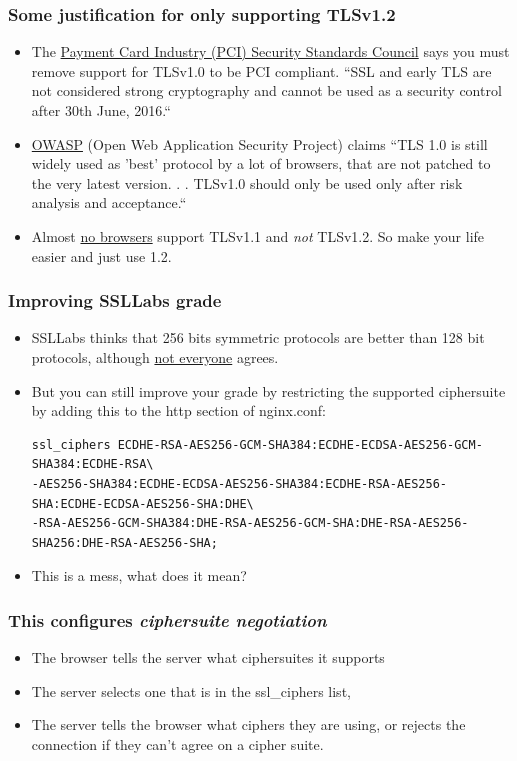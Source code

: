 \documentclass[9pt]{beamer}
\begin{document}
\begin{frame}[fragile]
\frametitle{Some justification for only supporting TLSv1.2}
\begin{itemize}
\item The \href{https://www.pcisecuritystandards.org/}{Payment Card Industry (PCI) Security Standards Council} says you must remove support for TLSv1.0 to be PCI compliant. ``SSL and early TLS are not considered strong cryptography and cannot be used as a security control after 30th June, 2016.``
\pause
\item \href{https://www.owasp.org/index.php/Transport_Layer_Protection_Cheat_Sheet}{OWASP} (Open Web Application Security Project) claims ``TLS 1.0 is still widely used as 'best' protocol by a lot of browsers, that are not patched to the very latest version.  . . TLSv1.0 should only be used only after risk analysis and acceptance.``
\pause
\item Almost \href{https://en.wikipedia.org/wiki/Transport_Layer_Security\#Web_browsers}{no browsers} support TLSv1.1 and \emph{not} TLSv1.2. So make your life easier and just use 1.2.
\end{itemize}
\end{frame}

\begin{frame}[fragile]
\frametitle{Improving SSLLabs grade}
\begin{itemize}
\item SSLLabs thinks that 256 bits symmetric protocols are better than 128 bit protocols, although \href{https://www.schneier.com/blog/archives/2009/07/another_new_aes.html}{not everyone} agrees.
\pause 
\item But you can still improve your grade by restricting the supported ciphersuite by adding this to the http section of nginx.conf:
\begin{verbatim}
ssl_ciphers ECDHE-RSA-AES256-GCM-SHA384:ECDHE-ECDSA-AES256-GCM-SHA384:ECDHE-RSA\
-AES256-SHA384:ECDHE-ECDSA-AES256-SHA384:ECDHE-RSA-AES256-SHA:ECDHE-ECDSA-AES256-SHA:DHE\
-RSA-AES256-GCM-SHA384:DHE-RSA-AES256-GCM-SHA:DHE-RSA-AES256-SHA256:DHE-RSA-AES256-SHA;
\end{verbatim}
\pause
\item This is a mess, what does it mean?
\end{itemize}
\end{frame}

\begin{frame}[fragile]
\frametitle{This configures \emph{ciphersuite negotiation}}
\begin{itemize}
\item The browser tells the server what ciphersuites it supports
\pause
\item The server selects one that is in the ssl\_ciphers list,
\pause
\item The server tells the browser what ciphers they are using, or rejects the connection if they can't agree on a cipher suite.
\end{itemize}
\end{frame}
\end{document}
